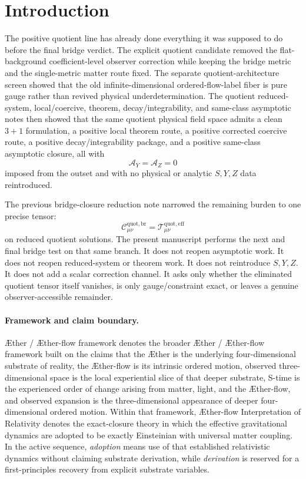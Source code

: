 \documentclass[11pt]{article}
\newcommand{\Aether}{\AE{}ther}
\newcommand{\Aflow}{\AE{}ther-flow}
\newcommand{\TheoryName}{\Aflow{} Interpretation of Relativity}
\newcommand{\TheoryProgram}{\Aether{} / \Aflow{} framework}
\newcommand{\AY}{\mathcal A_Y}
\newcommand{\AZ}{\mathcal A_Z}
\newcommand{\EffAux}{\mathcal T_{\mu\nu}^{\mathrm{quot,eff}}}
\newcommand{\BridgeCorr}{\mathcal C_{\mu\nu}^{\mathrm{quot,br}}}
\begin{document}
\section{Introduction}

The positive quotient line has already done everything it was supposed to do before the final bridge verdict. The explicit quotient candidate removed the flat-background coefficient-level observer correction while keeping the bridge metric and the single-metric matter route fixed. The separate quotient-architecture screen showed that the old infinite-dimensional ordered-flow-label fiber is pure gauge rather than revived physical underdetermination. The quotient reduced-system, local/coercive, theorem, decay/integrability, and same-class asymptotic notes then showed that the same quotient physical field space admits a clean \(3+1\) formulation, a positive local theorem route, a positive corrected coercive route, a positive decay/integrability package, and a positive same-class asymptotic closure, all with
\[
\AY=\AZ=0
\]
imposed from the outset and with no physical or analytic \(S,Y,Z\) data reintroduced.

The previous bridge-closure reduction note narrowed the remaining burden to one precise tensor:
\[
\BridgeCorr=\EffAux
\]
on reduced quotient solutions. The present manuscript performs the next and final bridge test on that same branch. It does not reopen asymptotic work. It does not reopen reduced-system or theorem work. It does not reintroduce \(S,Y,Z\). It does not add a scalar correction channel. It asks only whether the eliminated quotient tensor itself vanishes, is only gauge/constraint exact, or leaves a genuine observer-accessible remainder.

\paragraph{Framework and claim boundary.}
\TheoryProgram{} denotes the broader \Aether{} / \Aflow{} framework built on the claims that the \Aether{} is the underlying four-dimensional substrate of reality, the \Aflow{} is its intrinsic ordered motion, observed three-dimensional space is the local experiential slice of that deeper substrate, S-time is the experienced order of change arising from matter, light, and the \Aflow{}, and observed expansion is the three-dimensional appearance of deeper four-dimensional ordered motion. Within that framework, \TheoryName{} denotes the exact-closure theory in which the effective gravitational dynamics are adopted to be exactly Einsteinian with universal matter coupling. In the active sequence, \emph{adoption} means use of that established relativistic dynamics without claiming substrate derivation, while \emph{derivation} is reserved for a first-principles recovery from explicit substrate variables.
\end{document}
